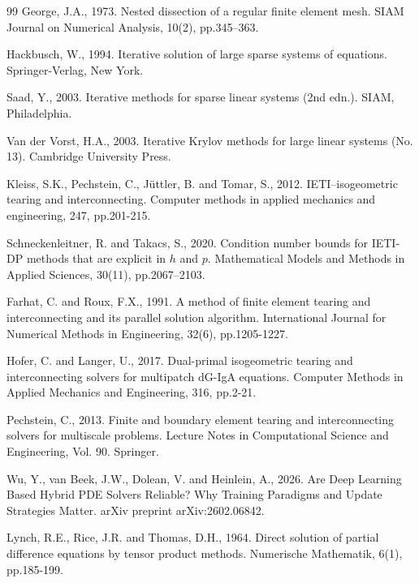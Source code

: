 \documentclass{article}
\theoremstyle{plain}
\numberwithin{equation}{section}
\begin{document}
\clearpage
\begin{thebibliography}{99}
    George, J.A., 1973. Nested dissection of a regular finite element mesh. SIAM Journal on Numerical Analysis, 10(2), pp.345--363.

    Hackbusch, W., 1994. Iterative solution of large sparse systems of equations. Springer-Verlag, New York.

    Saad, Y., 2003. Iterative methods for sparse linear systems (2nd edn.). SIAM, Philadelphia.

    Van der Vorst, H.A., 2003. Iterative Krylov methods for large linear systems (No. 13). Cambridge University Press.

    Kleiss, S.K., Pechstein, C., Jüttler, B. and Tomar, S., 2012. IETI–isogeometric tearing and interconnecting. Computer methods in applied mechanics and engineering, 247, pp.201-215.

    Schneckenleitner, R. and Takacs, S., 2020. Condition number bounds for IETI-DP methods that are explicit in $h$ and $p$. Mathematical Models and Methods in Applied Sciences, 30(11), pp.2067--2103.

    Farhat, C. and Roux, F.X., 1991. A method of finite element tearing and interconnecting and its parallel solution algorithm. International Journal for Numerical Methods in Engineering, 32(6), pp.1205-1227.

    Hofer, C. and Langer, U., 2017. Dual-primal isogeometric tearing and interconnecting solvers for multipatch dG-IgA equations. Computer Methods in Applied Mechanics and Engineering, 316, pp.2-21.

    Pechstein, C., 2013. Finite and boundary element tearing and interconnecting solvers for multiscale problems. Lecture Notes in Computational Science and Engineering, Vol. 90. Springer.

    Wu, Y., van Beek, J.W., Dolean, V. and Heinlein, A., 2026. Are Deep Learning Based Hybrid PDE Solvers Reliable? Why Training Paradigms and Update Strategies Matter. arXiv preprint arXiv:2602.06842.

    Lynch, R.E., Rice, J.R. and Thomas, D.H., 1964. Direct solution of partial difference equations by tensor product methods. Numerische Mathematik, 6(1), pp.185-199.


\end{thebibliography}
\end{document}
